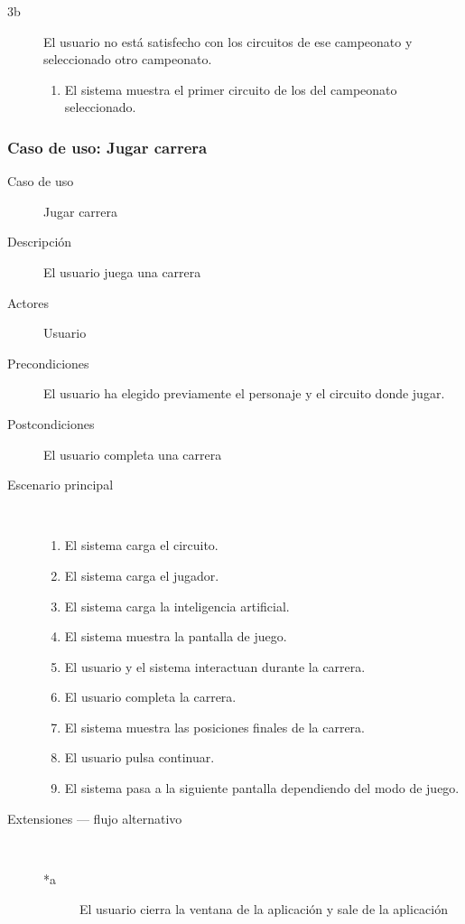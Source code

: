 \begin{description}
\begin{description}
            \item[3b ] El usuario no está satisfecho con los circuitos de ese campeonato y seleccionado otro campeonato.
            \begin{enumerate}
                \item El sistema muestra el primer circuito de los del campeonato seleccionado.
            \end{enumerate}
        \end{description}
\end{description}

\subsubsection{Caso de uso: Jugar carrera}

\begin{description}
    \item[Caso de uso] Jugar carrera
    \item[Descripción] El usuario juega una carrera
    \item[Actores] Usuario
    \item[Precondiciones] El usuario ha elegido previamente el personaje y el circuito donde jugar.
    \item[Postcondiciones] El usuario completa una carrera 
    \item[Escenario principal] $\quad$
        \begin{enumerate}
            \item El sistema carga el circuito.
            \item El sistema carga el jugador.
            \item El sistema carga la inteligencia artificial.
            \item El sistema muestra la pantalla de juego.
            \item El usuario y el sistema interactuan durante la carrera.
            \item El usuario completa la carrera.
            \item El sistema muestra las posiciones finales de la carrera.
            \item El usuario pulsa continuar.
            \item El sistema pasa a la siguiente pantalla dependiendo del modo de juego.
        \end{enumerate}
    \item[Extensiones --- flujo alternativo] $\quad$
        \begin{description}
            \item[*a ] El usuario cierra la ventana de la aplicación y sale de la aplicación
            

\end{description}
\end{description}
